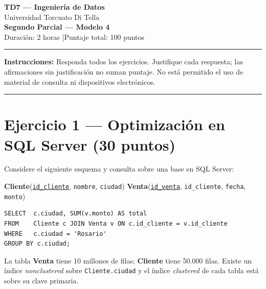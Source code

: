 \documentclass[11pt,a4paper]{article}
\begin{document}
\begin{center}
  {\LARGE\bfseries TD7 — Ingeniería de Datos}\\[6pt]
  {\large Universidad Torcuato Di Tella}\\[4pt]
  {\Large\bfseries Segundo Parcial — Modelo 4}\\[4pt]
  {\normalsize Duración: 2 horas \quad|\quad Puntaje total: 100 puntos}
\end{center}
\noindent\rule{\linewidth}{0.8pt}
\vspace{2pt}

\noindent\textbf{Instrucciones:} Responda todos los ejercicios. Justifique cada respuesta; las afirmaciones sin justificación no suman puntaje. No está permitido el uso de material de consulta ni dispositivos electrónicos.

\vspace{6pt}
\noindent\rule{\linewidth}{0.4pt}

\section*{Ejercicio 1 — Optimización en SQL Server \hfill\normalfont(30 puntos)}

Considere el siguiente esquema y consulta sobre una base en SQL Server:

\begin{center}
\textbf{Cliente}(\underline{\texttt{id\_cliente}}, \texttt{nombre}, \texttt{ciudad}) \qquad
\textbf{Venta}(\underline{\texttt{id\_venta}}, \texttt{id\_cliente}, \texttt{fecha}, \texttt{monto})
\end{center}

\begin{lstlisting}[style=log]
SELECT  c.ciudad, SUM(v.monto) AS total
FROM    Cliente c JOIN Venta v ON c.id_cliente = v.id_cliente
WHERE   c.ciudad = 'Rosario'
GROUP BY c.ciudad;
\end{lstlisting}

La tabla \textbf{Venta} tiene 10 millones de filas; \textbf{Cliente} tiene 50.000 filas. Existe un índice \textit{nonclustered} sobre \texttt{Cliente.ciudad} y el índice \textit{clustered} de cada tabla está sobre su clave primaria.
\end{document}
